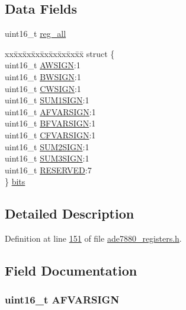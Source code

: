 \subsection*{Data Fields}
\begin{DoxyCompactItemize}
\item 
uint16\-\_\-t \hyperlink{a00031_a74e4d0cc3da3b66723322f38bfb7f371}{reg\-\_\-all}
\item 
\begin{tabbing}
xx\=xx\=xx\=xx\=xx\=xx\=xx\=xx\=xx\=\kill
struct \{\\
\>uint16\_t \hyperlink{a00031_a22c67f22fb72cc4760563226228fd3d1}{AWSIGN}:1\\
\>uint16\_t \hyperlink{a00031_a62075848f2d34b29d102a5dac93c8680}{BWSIGN}:1\\
\>uint16\_t \hyperlink{a00031_a5c90bde24a4e27d631856f8b4524572f}{CWSIGN}:1\\
\>uint16\_t \hyperlink{a00031_a435150f1cc3a4c23e4763a03af47cb8b}{SUM1SIGN}:1\\
\>uint16\_t \hyperlink{a00031_aff50a5787648a47861ab47ff75572c3f}{AFVARSIGN}:1\\
\>uint16\_t \hyperlink{a00031_a7bfc6dda668e0f2c865e9c550e859901}{BFVARSIGN}:1\\
\>uint16\_t \hyperlink{a00031_a2fc95f0b13f06314a07f0a18b6914fd4}{CFVARSIGN}:1\\
\>uint16\_t \hyperlink{a00031_a5eab599068b3048b2dc45f17c2af5105}{SUM2SIGN}:1\\
\>uint16\_t \hyperlink{a00031_a20415eddc27299295b6c2b25df1b7bd0}{SUM3SIGN}:1\\
\>uint16\_t \hyperlink{a00031_a9484db76faad15bb8da293c622dd2269}{RESERVED}:7\\
\} \hyperlink{a00031_adcef82d35bcb2388d5caaae80aab848e}{bits}\\

\end{tabbing}\end{DoxyCompactItemize}


\subsection{Detailed Description}


Definition at line \hyperlink{a00036_source_l00151}{151} of file \hyperlink{a00036_source}{ade7880\-\_\-registers.\-h}.



\subsection{Field Documentation}
\hypertarget{a00031_aff50a5787648a47861ab47ff75572c3f}{
\subsubsection[{A\-F\-V\-A\-R\-S\-I\-G\-N}]{\setlength{\rightskip}{0pt plus 5cm}uint16\-\_\-t A\-F\-V\-A\-R\-S\-I\-G\-N}}\label{df/d61/a00031_aff50a5787648a47861ab47ff75572c3f}


